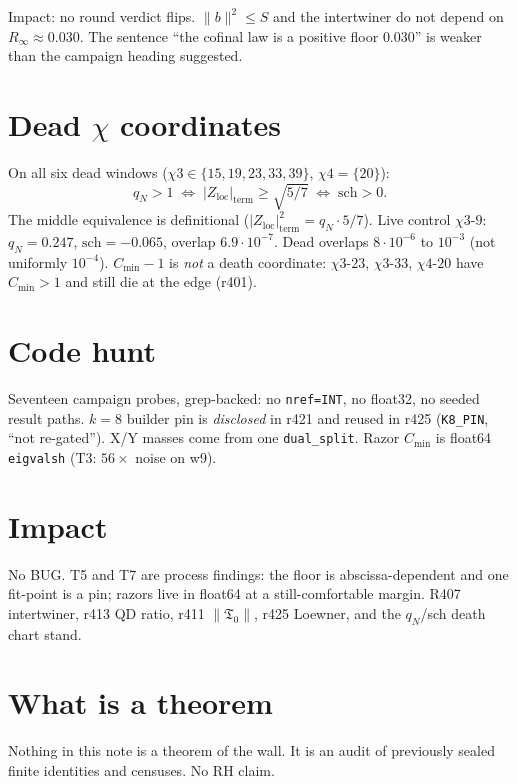 \documentclass[11pt]{article}
\theoremstyle{remark}
\newcommand{\Cmin}{C_{\min}}
\newcommand{\Tnull}{\mathfrak{T}_0}
\newcommand{\Zloc}{Z_{\mathrm{loc}}}
\begin{document}
Impact: no round verdict flips.
$\|b\|^2\le S$ and the intertwiner do
not depend on $R_\infty\approx0.030$.
The sentence ``the cofinal law is a
positive floor $0.030$'' is weaker than
the campaign heading suggested.

\section{Dead $\chi$ coordinates}\label{sec:T6}

On all six dead windows
($\chi3\in\{15,19,23,33,39\}$,
$\chi4=\{20\}$):
\[
  q_N>1
  \;\Longleftrightarrow\;
  |\Zloc|_{\mathrm{term}}\ge\sqrt{5/7}
  \;\Longleftrightarrow\;
  \mathrm{sch}>0.
\]
The middle equivalence is definitional
($|\Zloc|_{\mathrm{term}}^2=q_N\cdot5/7$).
Live control $\chi3$-$9$: $q_N=0.247$,
$\mathrm{sch}=-0.065$, overlap
$6.9\cdot10^{-7}$.
Dead overlaps $8\cdot10^{-6}$ to
$10^{-3}$ (not uniformly $10^{-4}$).
$\Cmin-1$ is \emph{not} a death
coordinate: $\chi3$-$23$, $\chi3$-$33$,
$\chi4$-$20$ have $\Cmin>1$ and still
die at the edge (r401).

\section{Code hunt}\label{sec:T7}

Seventeen campaign probes, grep-backed:
no \texttt{nref=INT}, no float32, no
seeded result paths.
$k=8$ builder pin is \emph{disclosed} in
r421 and reused in r425
(\texttt{K8\_PIN}, ``not re-gated'').
X/Y masses come from one \texttt{dual\_split}.
Razor $\Cmin$ is float64 \texttt{eigvalsh}
(T3: $56\times$ noise on w9).

\section{Impact}\label{sec:impact}

No BUG.
T5 and T7 are process findings:
the floor is abscissa-dependent and one
fit-point is a pin; razors live in
float64 at a still-comfortable margin.
R407 intertwiner, r413 QD ratio,
r411 $\|\Tnull\|$, r425 Loewner, and
the $q_N$/sch death chart stand.

\section{What is a theorem}\label{sec:honest}

Nothing in this note is a theorem of the
wall.
It is an audit of previously sealed
finite identities and censuses.
No RH claim.
\end{document}

